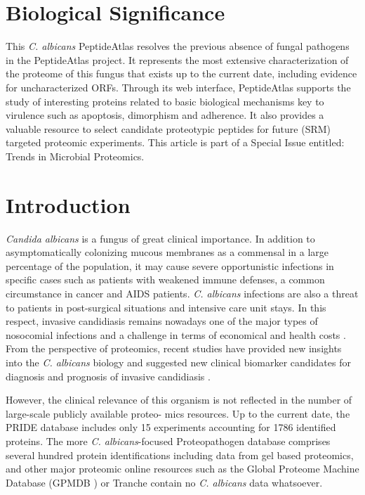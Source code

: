 \section*{Biological Significance}
This \textit{C. albicans} PeptideAtlas resolves the previous absence of fungal 
pathogens in the PeptideAtlas project. It represents the most extensive
characterization of the proteome of this fungus that exists up to the 
current date, including evidence for uncharacterized ORFs. Through its 
web interface, PeptideAtlas supports the study of interesting proteins 
related to basic biological mechanisms key to virulence such as 
apoptosis, dimorphism and adherence. It also provides a valuable 
resource to select candidate proteotypic peptides for future (SRM) 
targeted proteomic experiments. 
This article is part of a Special Issue entitled: Trends in Microbial Proteomics.


\section*{Introduction}

\textit{Candida albicans} is a fungus of great clinical importance. In
addition to asymptomatically colonizing mucous membranes
as a commensal in a large percentage of the population, it
may cause severe opportunistic infections in specific cases
such as patients with weakened immune defenses, a common
circumstance in cancer and AIDS patients. \textit{C. albicans} infections
are also a threat to patients in post-surgical situations and
intensive care unit stays. In this respect, invasive candidiasis
remains nowadays one of the major types of nosocomial
infections and a challenge in terms of economical and health
costs \citep{Wisplinghoff2004, Moran2010, Tong2008}.
From the perspective of proteomics, recent studies
have provided new insights into the \textit{C. albicans} biology and
suggested new clinical biomarker candidates for diagnosis and
prognosis of invasive candidiasis \citep{Pitarch2006, Pitarch2006a
Fernandez-Arenas2007, Pitarch2011}.

However, the clinical relevance of this organism is not
reflected in the number of large-scale publicly available proteo-
mics resources. Up to the current date, the PRIDE \citep{Vizcaino2013} database
includes only 15 experiments accounting for 1786 identified
proteins. The more \textit{C. albicans}-focused Proteopathogen database
\citep{Vialas2009b} comprises several hundred protein identifications including
data from gel based proteomics, and other major proteomic
online resources such as the Global Proteome Machine Database 
(GPMDB \citep{Craig2004}) or Tranche \citep{Smith2011} contain no \textit{C. albicans} data
whatsoever.


